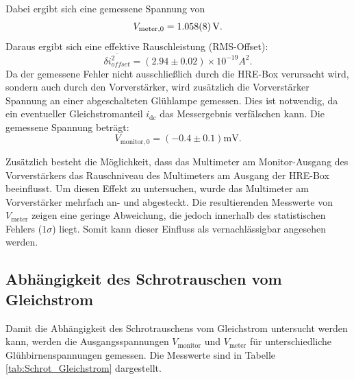 Dabei ergibt sich eine gemessene Spannung von
\begin{equation*}
    V_{\text{meter},0} = \SI{1.058 \pm 0.008}{\volt}.
\end{equation*}
Daraus ergibt sich eine effektive Rauschleistung (RMS-Offset):
\begin{equation*}
    \overline{\delta i_{offset}^2} = (2{.}94 \pm 0{.}02) \times 10^{-19} \si{A^2}.
\end{equation*}
Da der gemessene Fehler nicht ausschließlich durch die HRE-Box verursacht wird, sondern auch durch den Vorverstärker, wird zusätzlich die Vorverstärker Spannung an einer abgeschalteten Glühlampe gemessen. 
Dies ist notwendig, da ein eventueller Gleichstromanteil \( i_{\text{dc}} \) das Messergebnis verfälschen kann. 
Die gemessene Spannung beträgt:
\begin{equation*}
    V_{\text{monitor},0} = (-0.4 \pm 0.1) \si{\milli\volt}.
\end{equation*}

Zusätzlich besteht die Möglichkeit, dass das Multimeter am Monitor-Ausgang des Vorverstärkers das Rauschniveau des Multimeters am Ausgang der HRE-Box beeinflusst. 
Um diesen Effekt zu untersuchen, wurde das Multimeter am Vorverstärker mehrfach an- und abgesteckt. Die resultierenden Messwerte von \( V_{\text{meter}} \) zeigen eine geringe Abweichung, die jedoch innerhalb des statistischen Fehlers (\(1\sigma\)) liegt.
Somit kann dieser Einfluss als vernachlässigbar angesehen werden.

\subsection{Abhängigkeit des Schrotrauschen vom Gleichstrom}

Damit die Abhängigkeit des Schrotrauschens vom Gleichstrom untersucht werden kann, werden die Ausgangsspannungen \(V_{\text{monitor}}\) und \(V_{\text{meter}}\) für unterschiedliche Glühbirnenspannungen gemessen. 
Die Messwerte sind in Tabelle \ref{tab:Schrot_Gleichstrom} dargestellt.


